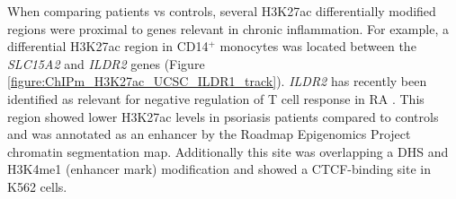 When comparing patients vs controls, several H3K27ac differentially modified regions were proximal to genes relevant in chronic inflammation. For example, a differential H3K27ac region in CD14$^+$ monocytes was located between the \textit{SLC15A2} and \textit{ILDR2} genes (Figure \ref{figure:ChIPm_H3K27ac_UCSC_ILDR1_track}). \textit{ILDR2} has recently been identified as relevant for negative regulation of T cell response in RA \parencite{Hecht2018}. This region showed lower H3K27ac levels in psoriasis patients compared to controls and was annotated as an enhancer by the Roadmap Epigenomics Project chromatin segmentation map. Additionally this site was overlapping a DHS and H3K4me1 (enhancer mark) modification and showed a CTCF-binding site in K562 cells. %






